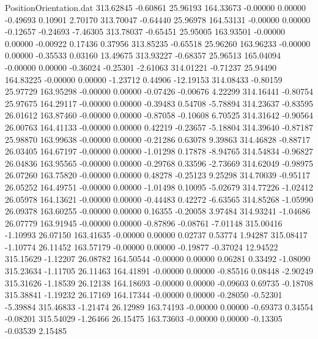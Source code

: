 \begin{filecontents}{PositionOrientation.dat}
 313.62845   -0.60861   25.96193   164.33673   -0.00000    0.00000   -0.49693    0.10901    2.70170
 313.70047   -0.64440   25.96978   164.53131   -0.00000    0.00000   -0.12657   -0.24693   -7.46305
 313.78037   -0.65451   25.95005   163.93501   -0.00000    0.00000   -0.00922    0.17436    0.37956
 313.85235   -0.65518   25.96260   163.96233   -0.00000    0.00000   -0.35533    0.03160   13.49675
 313.93227   -0.68357   25.96513   165.04094   -0.00000    0.00000   -0.36024   -0.25301   -2.61063
 314.01221   -0.71237   25.94490   164.83225   -0.00000    0.00000   -1.23712    0.44906  -12.19153
 314.08433   -0.80159   25.97729   163.95298   -0.00000    0.00000   -0.07426   -0.00676    4.22299
 314.16441   -0.80754   25.97675   164.29117   -0.00000    0.00000   -0.39483    0.54708   -5.78894
 314.23637   -0.83595   26.01612   163.87460   -0.00000    0.00000   -0.87058   -0.10608    6.70525
 314.31642   -0.90564   26.00763   164.41133   -0.00000    0.00000    0.42219   -0.23657   -5.18804
 314.39640   -0.87187   25.98870   163.99638   -0.00000    0.00000   -0.21286    0.63078    9.39863
 314.46828   -0.88717   26.03405   164.67197   -0.00000    0.00000   -1.01298    0.17878   -8.94765
 314.54834   -0.96827   26.04836   163.95565   -0.00000    0.00000   -0.29768    0.33596   -2.73669
 314.62049   -0.98975   26.07260   163.75820   -0.00000    0.00000    0.48278   -0.25123    9.25298
 314.70039   -0.95117   26.05252   164.49751   -0.00000    0.00000   -1.01498    0.10095   -5.02679
 314.77226   -1.02412   26.05978   164.13621   -0.00000    0.00000   -0.44483    0.42272   -6.63565
 314.85268   -1.05990   26.09378   163.60255   -0.00000    0.00000    0.16355   -0.20058    3.97484
 314.93241   -1.04686   26.07779   163.91945   -0.00000    0.00000   -0.87896   -0.08761   -7.01148
 315.00416   -1.10993   26.07150   163.41635   -0.00000    0.00000    0.02737    0.53774    1.94287
 315.08417   -1.10774   26.11452   163.57179   -0.00000    0.00000   -0.19877   -0.37024   12.94522
 315.15629   -1.12207   26.08782   164.50544   -0.00000    0.00000    0.06281    0.33492   -1.08090
 315.23634   -1.11705   26.11463   164.41891   -0.00000    0.00000   -0.85516    0.08448   -2.90249
 315.31626   -1.18539   26.12138   164.18693   -0.00000    0.00000   -0.09603    0.69735   -0.18708
 315.38841   -1.19232   26.17169   164.17344   -0.00000    0.00000   -0.28050   -0.52301   -5.39884
 315.46833   -1.21474   26.12989   163.74193   -0.00000    0.00000   -0.69373    0.34554   -0.08201
 315.54029   -1.26466   26.15475   163.73603   -0.00000    0.00000   -0.13305   -0.03539    2.15485

\end{filecontents}
